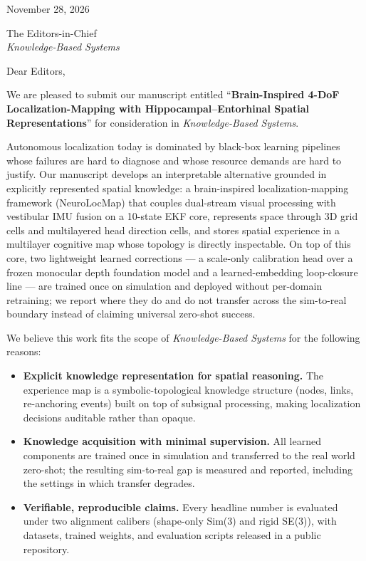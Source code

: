 \documentclass[11pt]{article}
\begin{document}
\noindent November 28, 2026

\vspace{1.5em}

\noindent The Editors-in-Chief\\
\emph{Knowledge-Based Systems}

\vspace{1.5em}

\noindent Dear Editors,

\vspace{0.8em}

We are pleased to submit our manuscript entitled ``\textbf{Brain-Inspired 4-DoF Localization-Mapping with Hippocampal--Entorhinal Spatial Representations}'' for consideration in \emph{Knowledge-Based Systems}.

\vspace{0.6em}

Autonomous localization today is dominated by black-box learning pipelines whose failures are hard to diagnose and whose resource demands are hard to justify. Our manuscript develops an interpretable alternative grounded in explicitly represented spatial knowledge: a brain-inspired localization-mapping framework (NeuroLocMap) that couples dual-stream visual processing with vestibular IMU fusion on a 10-state EKF core, represents space through 3D grid cells and multilayered head direction cells, and stores spatial experience in a multilayer cognitive map whose topology is directly inspectable. On top of this core, two lightweight learned corrections --- a scale-only calibration head over a frozen monocular depth foundation model and a learned-embedding loop-closure line --- are trained once on simulation and deployed without per-domain retraining; we report where they do and do not transfer across the sim-to-real boundary instead of claiming universal zero-shot success.

\vspace{0.6em}

We believe this work fits the scope of \emph{Knowledge-Based Systems} for the following reasons:

\begin{itemize}
    \item \textbf{Explicit knowledge representation for spatial reasoning.} The experience map is a symbolic-topological knowledge structure (nodes, links, re-anchoring events) built on top of subsignal processing, making localization decisions auditable rather than opaque.
    \item \textbf{Knowledge acquisition with minimal supervision.} All learned components are trained once in simulation and transferred to the real world zero-shot; the resulting sim-to-real gap is measured and reported, including the settings in which transfer degrades.
    \item \textbf{Verifiable, reproducible claims.} Every headline number is evaluated under two alignment calibers (shape-only Sim(3) and rigid SE(3)), with datasets, trained weights, and evaluation scripts released in a public repository.
\end{itemize}
\end{document}
